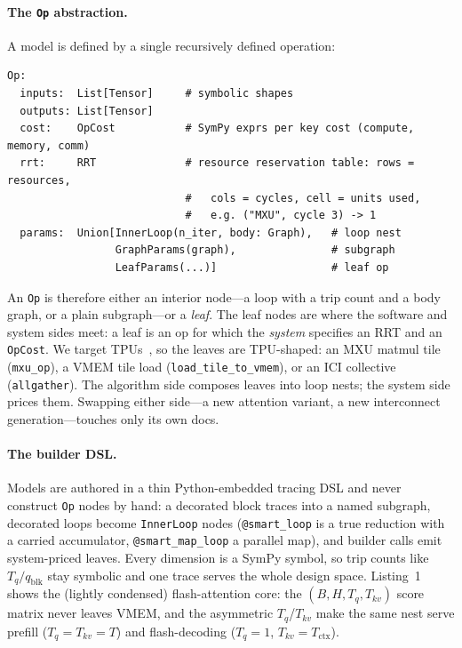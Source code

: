 \documentclass{article}
\begin{document}
\paragraph{The \texttt{Op} abstraction.} A model is defined by
a single recursively defined operation:

\begin{lstlisting}[style=ir]
Op:
  inputs:  List[Tensor]     # symbolic shapes
  outputs: List[Tensor]
  cost:    OpCost           # SymPy exprs per key cost (compute, memory, comm)
  rrt:     RRT              # resource reservation table: rows = resources,
                            #   cols = cycles, cell = units used,
                            #   e.g. ("MXU", cycle 3) -> 1
  params:  Union[InnerLoop(n_iter, body: Graph),   # loop nest
                 GraphParams(graph),               # subgraph
                 LeafParams(...)]                  # leaf op
\end{lstlisting}

An \texttt{Op} is therefore either an interior node---a loop with a trip count
and a body graph, or a plain subgraph---or a \emph{leaf}. The leaf nodes are
where the software and system sides meet: a leaf is an op for which the
\emph{system} specifies an RRT and an \texttt{OpCost}. We target
TPUs~\citep{jouppi2023tpu}, so the leaves are TPU-shaped: an MXU matmul tile
(\texttt{mxu\_op}), a VMEM tile load (\texttt{load\_tile\_to\_vmem}), or an
ICI collective (\texttt{allgather}). The algorithm side composes leaves into
loop nests; the system side prices them. Swapping either side---a new
attention variant, a new interconnect generation---touches only its own docs.

\paragraph{The builder DSL.} Models are authored in a thin Python-embedded
tracing DSL and never construct \texttt{Op} nodes by hand: a decorated block
traces into a named subgraph, decorated loops become \texttt{InnerLoop} nodes
(\texttt{@smart\_loop} is a true reduction with a carried accumulator,
\texttt{@smart\_map\_loop} a parallel map), and builder calls emit
system-priced leaves. Every dimension is a SymPy symbol, so trip counts like
$T_q/q_{\mathrm{blk}}$ stay symbolic and one trace serves the whole design
space. Listing~1 shows the (lightly condensed) flash-attention core: the
$(B,H,T_q,T_{kv})$ score matrix never leaves VMEM, and the asymmetric
$T_q$/$T_{kv}$ make the same nest serve prefill ($T_q{=}T_{kv}{=}T$) and
flash-decoding ($T_q{=}1$, $T_{kv}{=}T_{\mathrm{ctx}}$).
\end{document}
